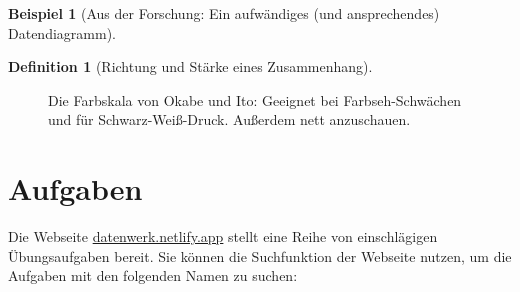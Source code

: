 \documentclass[
  a4paper,
]{scrbook}
\theoremstyle{definition}
\newtheorem{example}{Beispiel}[chapter]
\theoremstyle{definition}
\newtheorem{definition}{Definition}[chapter]
\theoremstyle{definition}
\theoremstyle{remark}
\begin{document}
\begin{example}[Aus der Forschung: Ein aufwändiges (und ansprechendes)
Datendiagramm]
\begin{definition}[Richtung und Stärke eines
Zusammenhang]
\begin{figure}[H]


\caption{\label{fig-okabe}Die Farbskala von Okabe und Ito: Geeignet bei
Farbseh-Schwächen und für Schwarz-Weiß-Druck. Außerdem nett
anzuschauen.}

\end{figure}%

\section{Aufgaben}\label{aufgaben-3}

Die Webseite \href{https://datenwerk.netlify.app}{datenwerk.netlify.app}
stellt eine Reihe von einschlägigen Übungsaufgaben bereit. Sie können
die Suchfunktion der Webseite nutzen, um die Aufgaben mit den folgenden
Namen zu suchen:


\end{definition}
\end{example}
\end{document}
